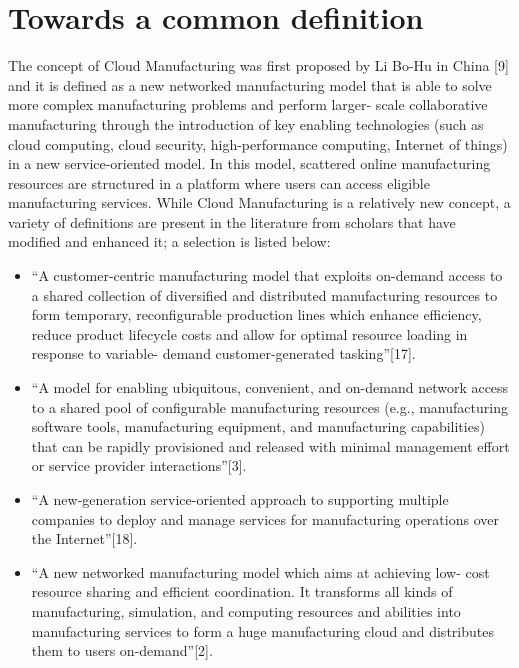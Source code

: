 \section{Towards a common definition}
The concept of Cloud Manufacturing was first proposed by Li Bo-Hu in China [9] and it is defined as a new networked manufacturing model that is able to solve more complex manufacturing problems and perform larger- scale collaborative manufacturing through the introduction of key enabling technologies (such as cloud computing, cloud security, high-performance computing, Internet of things) in a new service-oriented model. In this model, scattered online manufacturing resources are structured in a platform where users can access eligible manufacturing services. While Cloud Manufacturing is a relatively new concept, a variety of definitions are present in the literature from scholars that have modified and enhanced it; a selection is listed below:
\begin{itemize}
    \item “A customer-centric manufacturing model that exploits on-demand access to a shared collection of diversified and distributed manufacturing resources to form temporary, reconfigurable production lines which enhance efficiency, reduce product lifecycle costs and allow for optimal resource loading in response to variable- demand customer-generated tasking”[17].
    \item “A model for enabling ubiquitous, convenient, and on-demand network access to a shared pool of configurable manufacturing resources (e.g., manufacturing software tools, manufacturing equipment, and manufacturing capabilities) that can be rapidly provisioned and released with minimal management effort or service provider interactions”[3].
    \item “A new-generation service-oriented approach to supporting multiple companies to deploy and manage services for manufacturing operations over the Internet”[18].
    \item “A new networked manufacturing model which aims at achieving low- cost resource sharing and efficient coordination. It transforms all kinds of manufacturing, simulation, and computing resources and abilities into manufacturing services to form a huge manufacturing cloud and distributes them to users on-demand”[2].
\end{itemize}

